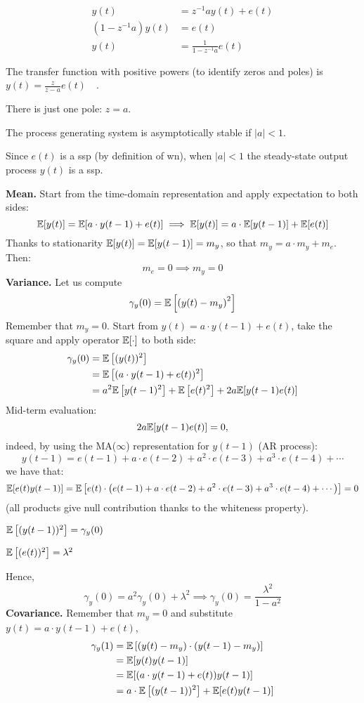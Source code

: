 \begin{align*}
	y(t)&=z^{-1} a y(t)+e(t) \\
	\left(1-z^{-1} a\right) y(t)&=e(t) \\
	y(t)&=\frac{1}{1-z^{-1} a} e(t)
\end{align*}

The transfer function with positive powers (to identify zeros and poles) is $y(t)=\frac{z}{z-a} e(t) \quad$.

There is just one pole: $z=a .$

The process generating system is asymptotically stable if $|a| <1$. 

Since $e(t)$ is a \gls{ssp} (by definition of \gls{wn}), when $|a| <1$ the steady-state output process $y(t)$ is a \gls{ssp}.

\textbf{Mean.}
Start from the time-domain representation and apply expectation to both sides:
\[
	\mathbb{E}[y(t)]=\mathbb{E}[a \cdot y(t-1)+e(t)] \implies \mathbb{E}[y(t)]=a \cdot \mathbb{E}[y(t-1)]+\mathbb{E}[e(t)]
\]
Thanks to stationarity $\mathbb{E}[y(t)]=\mathbb{E}[y(t-1)]=m_{y}$, so that $m_{y}=a \cdot m_{y}+m_{e}$.
Then:
$$
m_{e}=0 \implies  m_{y}=0
$$
\textbf{Variance.}
Let us compute
\[
	\gamma_{y}(0)=\mathbb{E}\left[\left(y(t)-m_{y}\right)^{2}\right]
\]
Remember that $m_{y}=0$. Start from $y(t)=a \cdot y(t-1)+e(t)$, take the square and apply operator $\mathbb{E}[\cdot]$ to both side:
\begin{align*}
	\gamma_{y}(0)&=\mathbb{E}\left[(y(t))^{2}\right]\\
	&=\mathbb{E}\left[(a \cdot y(t-1)+e(t))^{2}\right]\\
	&=a^{2} \mathbb{E}\left[y(t-1)^{2}\right]+\mathbb{E}\left[e(t)^{2}\right]+2 a \mathbb{E}[y(t-1) e(t)]\\
\end{align*}
Mid-term evaluation:
\[
	2 a \mathbb{E}[y(t-1) e(t)]=0,
\]
indeed, by using the MA($\infty$) representation for $y(t-1)$ (AR process):
$$
y(t-1)=e(t-1)+a \cdot e(t-2)+a^{2} \cdot e(t-3)+a^{3} \cdot e(t-4)+\cdots
$$
we have that:
\[
	\mathbb{E}[e(t) y(t-1)]=\mathbb{E}\left[e(t) \cdot\left(e(t-1)+a \cdot e(t-2)+a^{2} \cdot e(t-3)+a^{3} \cdot e(t-4)+\cdots\right)\right]=0
\]
(all products give null contribution thanks to the whiteness property).


$\mathbb{E}\left[(y(t-1))^{2}\right]=\gamma_{y}(0)$

$\mathbb{E}\left[(e(t))^{2}\right]=\lambda^{2}$

Hence,
\[
	\gamma_{y}(0)=a^{2} \gamma_{y}(0)+\lambda^{2} \implies \gamma_{y}(0)=\frac{\lambda^{2}}{1-a^{2}}
\]
\textbf{Covariance.}
Remember that $m_{y}=0$ and substitute $y(t)=a \cdot y(t-1)+e(t)$,
\begin{align*}
	\gamma_{y}(1)&=\mathbb{E}\left[\left(y(t)-m_{y}\right) \cdot\left(y(t-1)-m_{y}\right)\right]\\
	&=\mathbb{E}[y(t) y(t-1)]\\
	&=\mathbb{E}[(a \cdot y(t-1)+e(t))y(t-1)]\\
	&=a \cdot \mathbb{E}\left[(y(t-1))^{2}\right]+\mathbb{E}[e(t) y(t-1)]
\end{align*}

